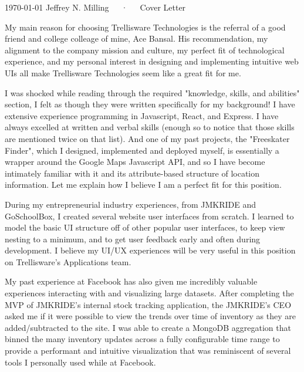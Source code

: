 \documentclass[11pt, a4paper]{awesome-cv-coverletter}
\begin{document}
\makecvheader[R]

\makecvfooter
  {\today}
  {Jeffrey N. Milling~~~·~~~Cover Letter}
  {}

\makelettertitle

\begin{cvletter}

My main reason for choosing Trellisware Technologies is the referral of a good
friend and college colleage of mine, Ace Bansal. His recommendation, my
alignment to the company mission and culture, my perfect fit of technological
experience, and my personal interest in designing and implementing intuitive web
UIs all make Trellisware Technologies seem like a great fit for me.

I was shocked while reading through the required "knowledge, skills, and
abilities" section, I felt as though they were written specifically for my
background! I have extensive experience programming in Javascript, React, and
Express. I have always excelled at written and verbal skills (enough so to
notice that those skills are mentioned twice on that list).  And one of my past
projects, the "Freeskater Finder", which I designed, implemented and deployed
myself, is essentially a wrapper around the Google Maps Javascript API, and so I
have become intimately familiar with it and its attribute-based structure of
location information. Let me explain how I believe I am a perfect fit for this
position. 

During my entrepreneurial industry experiences, from JMKRIDE and GoSchoolBox,
I created several website user interfaces from scratch. I learned to model the
basic UI structure off of other popular user interfaces, to keep view nesting to
a minimum, and to get user feedback early and often during development. I
believe my UI/UX experiences will be very useful in this position on
Trellisware's Applications team.

My past experience at Facebook has also given me incredibly valuable experiences
interacting with and visualizing large datasets. After completing the MVP of
JMKRIDE's internal stock tracking application, the JMKRIDE's CEO asked me if it
were possible to view the trends over time of inventory as they are
added/subtracted to the site. I was able to create a MongoDB aggregation that
binned the many inventory updates across a fully configurable time range to
provide a performant and intuitive visualization that was reminiscent of several
tools I personally used while at Facebook.


\end{cvletter}
\end{document}
